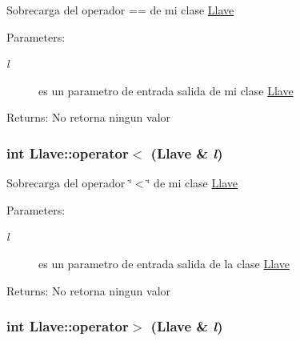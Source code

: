 Sobrecarga del operador == de mi clase \hyperlink{classLlave}{Llave} \begin{Desc}
\item[Parameters:]
\begin{description}
\item[{\em l}]es un parametro de entrada salida de mi clase \hyperlink{classLlave}{Llave} \end{description}
\end{Desc}
\begin{Desc}
\item[Returns:]No retorna ningun valor \end{Desc}
\hypertarget{classLlave_932475670e3d7c9e47ca0837d829a7eb}{
\subsubsection[operator$<$]{\setlength{\rightskip}{0pt plus 5cm}int Llave::operator$<$ ({\bf Llave} \& {\em l})}}
\label{classLlave_932475670e3d7c9e47ca0837d829a7eb}


Sobrecarga del operador \char`\"{}$<$\char`\"{} de mi clase \hyperlink{classLlave}{Llave} \begin{Desc}
\item[Parameters:]
\begin{description}
\item[{\em l}]es un parametro de entrada salida de la clase \hyperlink{classLlave}{Llave} \end{description}
\end{Desc}
\begin{Desc}
\item[Returns:]No retorna ningun valor \end{Desc}
\hypertarget{classLlave_be84640478b66d4114fc5995b7981dfb}{
\subsubsection[operator$>$]{\setlength{\rightskip}{0pt plus 5cm}int Llave::operator$>$ ({\bf Llave} \& {\em l})}}
\label{classLlave_be84640478b66d4114fc5995b7981dfb}


